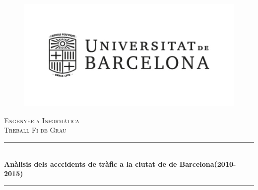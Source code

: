 \begin{titlepage}

\newcommand{\HRule}{\rule{\linewidth}{0.5mm}} %

\center %
 
\begin{figure}[h]
\centering
\includegraphics[scale=0.7]{logo-universitat.jpg}
\end{figure}

\textsc{\large Engenyeria Informàtica}\\[0.5cm] %
\textsc{\LARGE Treball Fi  de Grau}\\[0.5cm] %


\HRule \\[0.4cm]
{ \huge \bfseries  Anàlisis dels acccidents de tràfic a la ciutat de de Barcelona(2010-2015)}\\[0.4cm] %
\HRule \\[1.5cm]
 

\begin{multicols}{2}


\end{multicols}
\end{titlepage}
